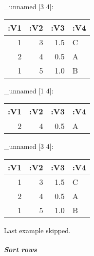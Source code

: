 \documentclass[]{article}
\newenvironment{Shaded}{\begin{snugshade}}{\end{snugshade}}
\newcommand{\KeywordTok}[1]{\textcolor[rgb]{0.13,0.29,0.53}{\textbf{#1}}}
\newcommand{\DecValTok}[1]{\textcolor[rgb]{0.00,0.00,0.81}{#1}}
\newcommand{\VariableTok}[1]{\textcolor[rgb]{0.00,0.00,0.00}{#1}}
\newcommand{\AttributeTok}[1]{\textcolor[rgb]{0.77,0.63,0.00}{#1}}
\newcommand{\NormalTok}[1]{#1}
\let\oldsubparagraph\subparagraph
\renewcommand{\subparagraph}[1]{\oldsubparagraph{#1}\mbox{}}
\begin{document}
\begin{Shaded}
\end{Shaded}

\_unnamed {[}3 4{]}:

\begin{longtable}[]{@{}rrrl@{}}
\toprule
:V1 & :V2 & :V3 & :V4\tabularnewline
\midrule
\endhead
1 & 3 & 1.5 & C\tabularnewline
2 & 4 & 0.5 & A\tabularnewline
1 & 5 & 1.0 & B\tabularnewline
\bottomrule
\end{longtable}

\begin{Shaded}
\end{Shaded}

\_unnamed {[}1 4{]}:

\begin{longtable}[]{@{}rrrl@{}}
\toprule
:V1 & :V2 & :V3 & :V4\tabularnewline
\midrule
\endhead
2 & 4 & 0.5 & A\tabularnewline
\bottomrule
\end{longtable}

\begin{Shaded}
\end{Shaded}

\_unnamed {[}3 4{]}:

\begin{longtable}[]{@{}rrrl@{}}
\toprule
:V1 & :V2 & :V3 & :V4\tabularnewline
\midrule
\endhead
1 & 3 & 1.5 & C\tabularnewline
2 & 4 & 0.5 & A\tabularnewline
1 & 5 & 1.0 & B\tabularnewline
\bottomrule
\end{longtable}

Last example skipped.

\subparagraph{Sort rows}\label{sort-rows}
\end{document}
